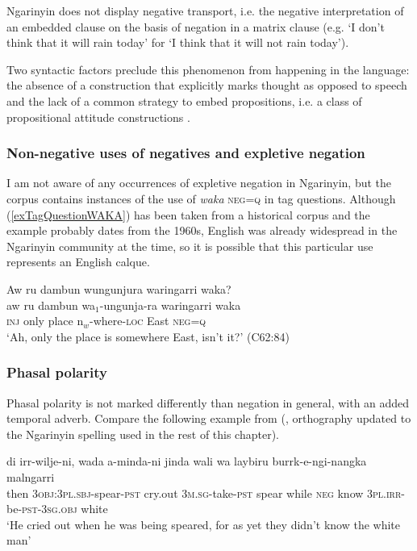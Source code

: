 \documentclass[output=paper,colorlinks,citecolor=brown]{langscibook}
\begin{document}
Ngarinyin does not display negative transport, i.e. the negative interpretation of an embedded clause on the basis of negation in a matrix clause (e.g. `I don't think that it will rain today' for `I think that it will not rain today').

Two syntactic factors preclude this phenomenon from happening in the language: the absence of a construction that explicitly marks thought as opposed to speech \citep[97]{Spronck2015} and the lack of a common strategy to embed propositions, i.e. a class of propositional attitude constructions \citep[133]{Spronck2015}.

\subsubsection{Non-negative uses of negatives and expletive negation}

I am not aware of any occurrences of expletive negation in Ngarinyin, but the corpus contains instances of the use of \textit{\textit{waka}} \textsc{neg=q} in tag questions. Although (\ref{exTagQuestionWAKA}) has been taken from a historical corpus and the example probably dates from the 1960s, English was already widespread in the Ngarinyin community at the time, so it is possible that this particular use represents an English calque.

\begin{exe}
\ex \label{exTagQuestionWAKA}
\glll Aw ru dambun wungunjura waringarri waka?\\
aw ru dambun wa$_1$-ungunja-ra waringarri waka\\
\textsc{inj} only place n$_w$-where-\textsc{loc} East \textsc{neg=q}\\
\trans `Ah, only the place is somewhere East, isn't it?' (C62:84)
\end{exe}

\subsubsection{Phasal polarity}
Phasal polarity is not marked differently than negation in general, with an added temporal adverb. Compare the following example from (\citealt{CoateOates1970}, orthography updated to the Ngarinyin spelling used in the rest of this chapter).

\ea\label{ex:nga:additional}
    \gll di irr-wilje-ni, wada a-minda-ni jinda wali wa laybiru burrk-e-ngi-nangka malngarri \\
    then \textsc{3obj:3pl.sbj}-spear-\textsc{pst} {cry.out} \textsc{3m.sg}-take-\textsc{pst} spear while \textsc{neg} know \textsc{3pl.irr}-be-\textsc{pst-3sg.obj} white \\
\glt `He cried out when he was being speared, for as yet they didn't know the white man' \citep[82]{CoateOates1970}
\z
\end{document}
